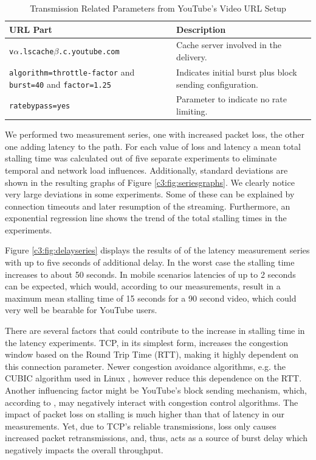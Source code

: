\begin{table}[htbp]
\renewcommand{\arraystretch}{1.3}
\caption{Transmission Related Parameters from YouTube's Video URL Setup}
\label{c3:tbl:yturl}
\centering
\begin{tabu}{|X[l]|X[p]|}
\hline
URL Part & Description \\ \hline
\texttt{v$\alpha$.lscache$\beta$.c.youtube.com} &  Cache server involved in the delivery.\\
\texttt{algorithm=throttle-factor} and \texttt{burst=40} and \texttt{factor=1.25} & Indicates initial burst plus block sending configuration. \\
\texttt{ratebypass=yes} & Parameter to indicate no rate limiting.\\ \hline
\end{tabu}

\end{table}

We performed two measurement series, one with increased packet loss, the other one adding latency to the path. For each value of loss and latency a mean total stalling time was calculated out of five separate experiments to eliminate temporal and network load influences. Additionally, standard deviations are shown in the resulting graphs of Figure \ref{c3:fig:seriesgraphs}. We clearly notice very large deviations in some experiments. Some of these can be explained by connection timeouts and later resumption of the streaming. Furthermore, an exponential regression line shows the trend of the total stalling times in the experiments.


Figure \ref{c3:fig:delayseries} displays the results of of the latency measurement series with up to five seconds of additional delay. In the worst case the stalling time increases to about 50 seconds. In mobile scenarios latencies of up to 2 seconds can be expected, which would, according to our measurements, result in a maximum mean stalling time of 15 seconds for a 90 second video, which could very well be bearable for YouTube users.

There are several factors that could contribute to the increase in stalling time in the latency experiments. 
TCP, in its simplest form, increases the congestion window based on the Round Trip Time (RTT), making it highly dependent on this connection parameter. Newer congestion avoidance algorithms, e.g. the CUBIC algorithm used in Linux \cite{ha2008cubic}, however reduce this dependence on the RTT.
Another influencing factor might be YouTube's block sending mechanism, which, according to \cite{alcock2011afcyt}, may negatively interact with congestion control algorithms. The impact of packet loss on stalling is much higher than that of latency in our measurements. Yet, due to TCP's reliable transmissions, loss only causes increased packet retransmissions, and, thus, acts as a source of burst delay which negatively impacts the overall throughput.

